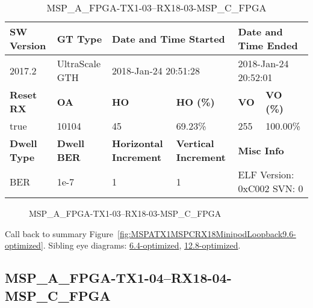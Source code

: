 \begin{table}[h]
\centering
\caption{MSP\_A\_FPGA-TX1-03--RX18-03-MSP\_C\_FPGA}
\label{tab:MSPAFPGATX103RX1803MSPCFPGA9.6-optimized}
\begin{tabular}{@{}|l|l|l|l|l|l|@{}}
\toprule
\textbf{SW Version}                & \textbf{GT Type}   & \multicolumn{2}{l|}{\textbf{Date and Time Started}}            & \multicolumn{2}{l|}{\textbf{Date and Time Ended}}        \\ \midrule
2017.2                       & UltraScale GTH          & \multicolumn{2}{l|}{2018-Jan-24 20:51:28}                   & \multicolumn{2}{l|}{2018-Jan-24 20:52:01}               \\ \midrule
\textbf{Reset RX}                  & \textbf{OA} & \textbf{HO}   & \textbf{HO (\%)} & \textbf{VO} & \textbf{VO (\%)} \\ \midrule
true & 10104        & 45          & 69.23\%        & 255        & 100.00\%       \\ \midrule
\textbf{Dwell Type}                & \textbf{Dwell BER} & \textbf{Horizontal Increment} & \textbf{Vertical Increment}    & \multicolumn{2}{l|}{\textbf{Misc Info}}                  \\ \midrule
BER                            & 1e-7        & 1        & 1           & \multicolumn{2}{l|}{ELF Version: 0xC002 SVN: 0}                         \\ \bottomrule
\end{tabular}
\end{table}

\begin{figure}[h]
\caption{MSP\_A\_FPGA-TX1-03--RX18-03-MSP\_C\_FPGA} \label{fig:MSPAFPGATX103RX1803MSPCFPGA9.6-optimized}
\end{figure}

Call back to summary Figure~\ref{fig:MSPATX1MSPCRX18MinipodLoopback9.6-optimized}.
Sibling eye diagrams: \hyperref[sec:MSPAFPGATX103RX1803MSPCFPGA6.4-optimized]{6.4-optimized}, \hyperref[sec:MSPAFPGATX103RX1803MSPCFPGA12.8-optimized]{12.8-optimized}.

\clearpage
\newpage


\subsection{MSP\_A\_FPGA-TX1-04--RX18-04-MSP\_C\_FPGA}\label{sec:MSPAFPGATX104RX1804MSPCFPGA9.6-optimized}

